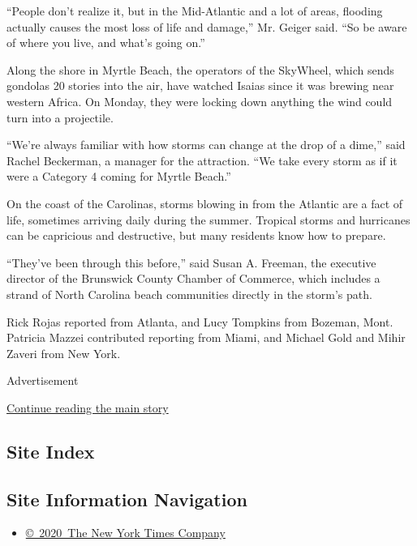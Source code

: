 ``People don't realize it, but in the Mid-Atlantic and a lot of areas,
flooding actually causes the most loss of life and damage,'' Mr. Geiger
said. ``So be aware of where you live, and what's going on.''

Along the shore in Myrtle Beach, the operators of the SkyWheel, which
sends gondolas 20 stories into the air, have watched Isaias since it was
brewing near western Africa. On Monday, they were locking down anything
the wind could turn into a projectile.

``We're always familiar with how storms can change at the drop of a
dime,'' said Rachel Beckerman, a manager for the attraction. ``We take
every storm as if it were a Category 4 coming for Myrtle Beach.''

On the coast of the Carolinas, storms blowing in from the Atlantic are a
fact of life, sometimes arriving daily during the summer. Tropical
storms and hurricanes can be capricious and destructive, but many
residents know how to prepare.

``They've been through this before,'' said Susan A. Freeman, the
executive director of the Brunswick County Chamber of Commerce, which
includes a strand of North Carolina beach communities directly in the
storm's path.

Rick Rojas reported from Atlanta, and Lucy Tompkins from Bozeman, Mont.
Patricia Mazzei contributed reporting from Miami, and Michael Gold and
Mihir Zaveri from New York.

Advertisement

\protect\hyperlink{after-bottom}{Continue reading the main story}

\hypertarget{site-index}{%
\subsection{Site Index}\label{site-index}}

\hypertarget{site-information-navigation}{%
\subsection{Site Information
Navigation}\label{site-information-navigation}}

\begin{itemize}
\tightlist
\item
  \href{https://help.nytimes3xbfgragh.onion/hc/en-us/articles/115014792127-Copyright-notice}{©~2020~The
  New York Times Company}
\end{itemize}

